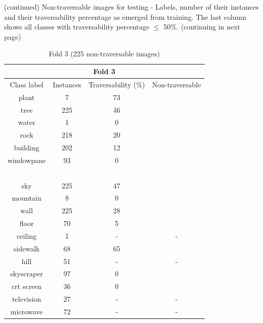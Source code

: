 \documentclass[12pt,a4paper,table,dvipsnames,tikz]{report}
\newcommand{\white}[1]{\textbf{\textcolor{white}{#1}}} %
\begin{document}
	\begin{table}[h!]
		\ContinuedFloat %
		\caption{(continued) Non-traversable images for testing - Labels, number of their instances 
			and their traversability percentage as emerged from training. The last column shows all 
			classes with traversability percentage $\le$ 50\%. (continuing in next page)}
		\begin{subtable}[h!]{\textwidth}
			\caption{Fold 3 (225 non-traversable images)}
			\centering
			\begin{tabular}{|c|c|c|c|}
				\hline
				\multicolumn{4}{|c|}{Fold 3}\\
				\hline
				Class label & Instances & Traversability (\%) & Non-traversable\\
				\hline\hline
				plant & 7 & 73 &\\
				\hline
				\rowcolor{tree}
				tree & 225 & 46 & \checkmark\\
				\hline
				water & 1 & 0 & \checkmark\\
				\hline
				rock & 218 & 20 & \checkmark\\
				\hline
				building & 202 & 12 & \checkmark\\
				\hline
				windowpane & 93 & 0 & \checkmark\\
				\hline
				\rowcolor{earth}
				\white{earth} & \white{220} & \white{47} & \white{\checkmark}\\
				\hline
				\rowcolor{sky}
				sky & 225 & 47 & \checkmark\\
				\hline
				mountain & 8 & 0 & \checkmark\\
				\hline
				wall & 225 & 28 & \checkmark\\
				\hline
				floor & 70 & 5 & \checkmark\\
				\hline
				ceiling & 1 & - & -\\
				\hline
				sidewalk & 68 & 65 &\\
				\hline
				hill & 51 & - & -\\
				\hline
				skyscraper & 97 & 0 & \checkmark\\
				\hline
				crt screen & 36 & 0 & \checkmark\\
				\hline
				television & 27 & - & -\\
				\hline
				microwave & 72 & - & -\\
				\hline
			\end{tabular}
			\label{table:obst.f3}
		\end{subtable}
	\end{table}
	
\end{document}

